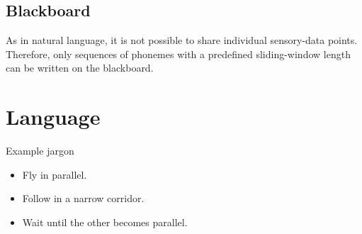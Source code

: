 \documentclass[a4paper]{article}
\begin{document}
      \subsection{Blackboard}
         As in natural language, it is not possible to share individual sensory-data points. Therefore, only sequences of phonemes with a predefined sliding-window length can be written on the blackboard.

   \section{Language}
      Example jargon
      \begin{itemize}
         \item Fly in parallel.
         \item Follow in a narrow corridor.
         \item Wait until the other becomes parallel.
      \end{itemize}



      
      
\end{document}
